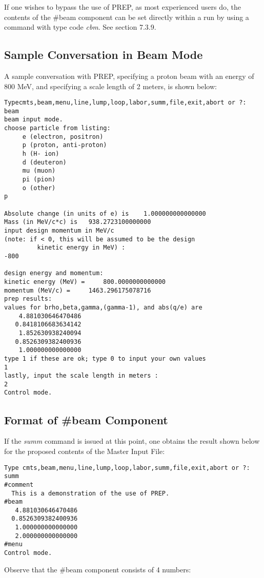 If one wishes to bypass the use of PREP, as most experienced \Mary users do, the contents of the \#beam component can be set directly within a \Mary run by using a command with type code {\em cbm}.  See section 7.3.9.

\subsection{Sample Conversation in Beam Mode} A sample conversation with
PREP, specifying a proton beam with an energy of 800 MeV, and specifying a
scale length of 2 meters, is shown below:
\begin{footnotesize}
\begin{verbatim}
Typecmts,beam,menu,line,lump,loop,labor,summ,file,exit,abort or ?:
beam
beam input mode.
choose particle from listing:
     e (electron, positron)
     p (proton, anti-proton)
     h (H- ion)
     d (deuteron)
     mu (muon)
     pi (pion)
     o (other)
p

Absolute change (in units of e) is    1.000000000000000
Mass (in MeV/c*c) is   938.2723100000000
input design momentum in MeV/c
(note: if < 0, this will be assumed to be the design
         kinetic energy in MeV) :
-800

design energy and momentum:
kinetic energy (MeV) =     800.0000000000000
momentum (MeV/c) =     1463.296175078716
prep results:
values for brho,beta,gamma,(gamma-1), and abs(q/e) are
    4.881030646470486
   0.8418106683634142
    1.852630938240094
   0.8526309382400936
    1.000000000000000
type 1 if these are ok; type 0 to input your own values
1
lastly, input the scale length in meters :
2
Control mode.
\end{verbatim}
\end{footnotesize}
\subsection{Format of \#beam Component} If the {\em summ} command is issued
at this point, one obtains the result shown below for the proposed contents
of the Master Input File:
\begin{footnotesize}
\begin{verbatim}
Type cmts,beam,menu,line,lump,loop,labor,summ,file,exit,abort or ?:
summ
#comment
  This is a demonstration of the use of PREP.
#beam
   4.881030646470486
  0.8526309382400936
   1.000000000000000
   2.000000000000000
#menu
Control mode.
\end{verbatim}
\end{footnotesize} Observe that the \#beam component consists of 4
numbers:     

